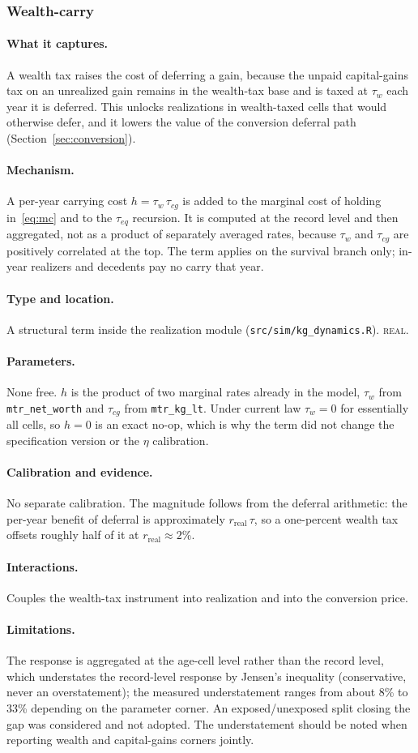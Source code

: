 \documentclass[11pt]{article}
\newcommand{\code}[1]{\texttt{\small #1}}
\newcommand{\field}[1]{\paragraph{#1.}}
\begin{document}
\subsubsection{Wealth-carry}
\label{sec:carry}

\field{What it captures}
A wealth tax raises the cost of deferring a gain, because the unpaid
capital-gains tax on an unrealized gain remains in the wealth-tax base and is
taxed at $\tau_w$ each year it is deferred. This unlocks realizations in
wealth-taxed cells that would otherwise defer, and it lowers the value of the
conversion deferral path (Section~\ref{sec:conversion}).

\field{Mechanism}
A per-year carrying cost $h=\tau_w\,\tau_{cg}$ is added to the marginal cost of
holding in~\eqref{eq:mc} and to the $\tau_{eq}$ recursion. It is computed at the
record level and then aggregated, not as a product of separately averaged rates,
because $\tau_w$ and $\tau_{cg}$ are positively correlated at the top. The term
applies on the survival branch only; in-year realizers and decedents pay no
carry that year.

\field{Type and location}
A structural term inside the realization module (\code{src/sim/kg_dynamics.R}).
\textsc{real}.

\field{Parameters}
None free. $h$ is the product of two marginal rates already in the model,
$\tau_w$ from \code{mtr_net_worth} and $\tau_{cg}$ from \code{mtr_kg_lt}. Under
current law $\tau_w=0$ for essentially all cells, so $h=0$ is an exact no-op,
which is why the term did not change the specification version or the $\eta$
calibration.

\field{Calibration and evidence}
No separate calibration. The magnitude follows from the deferral arithmetic: the
per-year benefit of deferral is approximately $r_{\text{real}}\,\tau$, so a
one-percent wealth tax offsets roughly half of it at $r_{\text{real}}\approx2\%$.

\field{Interactions}
Couples the wealth-tax instrument into realization and into the conversion price.

\field{Limitations}
The response is aggregated at the age-cell level rather than the record level,
which understates the record-level response by Jensen's inequality (conservative,
never an overstatement); the measured understatement ranges from about 8\% to
33\% depending on the parameter corner. An exposed/unexposed split closing the
gap was considered and not adopted. The understatement should be noted when
reporting wealth and capital-gains corners jointly.
\end{document}
